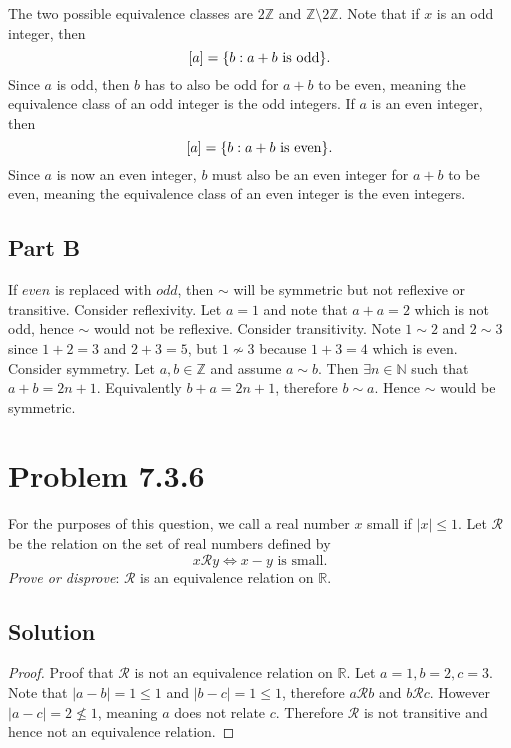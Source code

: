\documentclass[12pt]{extarticle}
\begin{document}
The two possible equivalence classes are $2\mathbb{Z}$ and $\mathbb{Z}\setminus 2\mathbb{Z}$. Note that if $x$ is an odd integer, then
\[
	[a] = \qty{b : a + b \text{ is odd}}
.\]
Since $a$ is odd, then $b$ has to also be odd for $a + b$ to be even, meaning the equivalence class of an odd integer is the odd integers. If $a$ is an even integer, then
\[
	[a] = \qty{b : a + b \text{ is even}}
.\]
Since $a$ is now an even integer, $b$ must also be an even integer for $a + b$ to be even, meaning the equivalence class of an even integer is the even integers.

\subsection*{Part B}

If $even$ is replaced with $odd$, then $\sim$ will be symmetric but not reflexive or transitive. Consider reflexivity. Let $a = 1$ and note that $a + a = 2$ which is not odd, hence $\sim$ would not be reflexive. Consider transitivity. Note $1 \sim 2$ and $2 \sim 3$ since $1 + 2 = 3$ and $2 + 3 = 5$, but $1 \not\sim 3$ because $1 + 3 = 4$ which is even. Consider symmetry. Let $a,b \in \mathbb{Z}$ and assume $a \sim b$. Then $\exists n \in \mathbb{N}$ such that $a + b = 2n + 1$. Equivalently $b + a = 2n+1$, therefore $b \sim a$. Hence $\sim$ would be symmetric.

\section*{Problem 7.3.6}
For the purposes of this question, we call a real number $x$ small if $|x| \leq 1$. Let $\mathcal{R}$ be the relation on the set of real numbers defined by
\[
	x\mathcal{R}y \Longleftrightarrow x - y \text{ is small}
.\]
\textit{Prove or disprove}: $\mathcal{R}$ is an equivalence relation on $\mathbb{R}$.

\subsection*{Solution}
\begin{proof}
	Proof that $\mathcal{R}$ is not an equivalence relation on $\mathbb{R}$. Let $a = 1, b = 2, c= 3$. Note that $|a - b| = 1 \leq 1$ and $|b - c| = 1 \leq 1$, therefore $a \mathcal{R} b$ and $b \mathcal{R} c$. However $|a - c| = 2 \nleq 1$, meaning $a$ does not relate $c$. Therefore $\mathcal{R}$ is not transitive and hence not an equivalence relation.
\end{proof}
\end{document}
